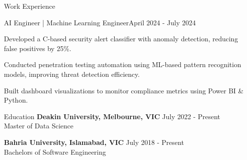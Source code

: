 \documentclass{resume} %
\begin{document}
    \begin{rSection}{Work Experience}
                    \begin{rSubsection}
                {AI Engineer | Machine Learning Engineer}{April 2024 - July 2024}
                                    {}
                                {}
                                    \item Developed a C{-}based security alert classifier with anomaly detection, reducing false positives by 25\%.
                                    \item Conducted penetration testing automation using ML{-}based pattern recognition models, improving threat detection efficiency.
                                    \item Built dashboard visualizations to monitor compliance metrics using Power BI \& Python.
                            \end{rSubsection}
            \end{rSection}

\begin{rSection}{Education}
                        \textbf{Deakin University, Melbourne, VIC} \hfill {July 2022 - Present} \\
                            {Master of Data Science}
                         
             
         
                        \textbf{Bahria University, Islamabad, VIC} \hfill {July 2018 - Present} \\
                            {Bachelors of Software Engineering}
                         
             
         
    \end{rSection}
\end{document}
